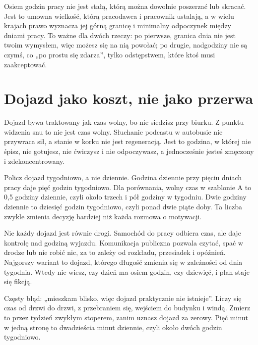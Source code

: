 Osiem godzin pracy nie jest stałą, którą można dowolnie poszerzać lub skracać. Jest to umowna wielkość, którą pracodawca i pracownik ustalają, a w wielu krajach prawo wyznacza jej górną granicę i minimalny odpoczynek między dniami pracy. To ważne dla dwóch rzeczy: po pierwsze, granica dnia nie jest twoim wymysłem, więc możesz się na nią powołać; po drugie, nadgodziny nie są czymś, co „po prostu się zdarza”, tylko odstępstwem, które ktoś musi zaakceptować.

\section{Dojazd jako koszt, nie jako przerwa}

Dojazd bywa traktowany jak czas wolny, bo nie siedzisz przy biurku. Z punktu widzenia snu to nie jest czas wolny. Słuchanie podcastu w autobusie nie przywraca sił, a stanie w korku nie jest regeneracją. Jest to godzina, w której nie śpisz, nie gotujesz, nie ćwiczysz i nie odpoczywasz, a jednocześnie jesteś zmęczony i zdekoncentrowany.

Policz dojazd tygodniowo, a nie dziennie. Godzina dziennie przy pięciu dniach pracy daje pięć godzin tygodniowo. Dla porównania, wolny czas w szablonie A to 0,5 godziny dziennie, czyli około trzech i pół godziny w tygodniu. Dwie godziny dziennie to dziesięć godzin tygodniowo, czyli ponad dwie piąte doby. Ta liczba zwykle zmienia decyzję bardziej niż każda rozmowa o motywacji.

Nie każdy dojazd jest równie drogi. Samochód do pracy odbiera czas, ale daje kontrolę nad godziną wyjazdu. Komunikacja publiczna pozwala czytać, spać w drodze lub nie robić nic, za to zależy od rozkładu, przesiadek i opóźnień. Najgorszy wariant to dojazd, którego długość zmienia się w zależności od dnia tygodnia. Wtedy nie wiesz, czy dzień ma osiem godzin, czy dziewięć, i plan staje się fikcją.

\begin{falle}
Częsty błąd: „mieszkam blisko, więc dojazd praktycznie nie istnieje”. Liczy się czas od drzwi do drzwi, z przebraniem się, wejściem do budynku i windą. Zmierz to przez tydzień zwykłym stoperem, zanim uznasz dojazd za zerowy. Pięć minut w jedną stronę to dwadzieścia minut dziennie, czyli około dwóch godzin tygodniowo.
\end{falle}

